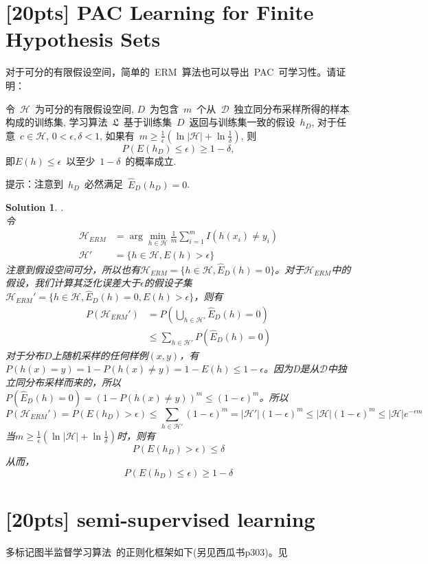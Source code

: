 \documentclass[a4paper,UTF8]{article}
\newtheorem*{solution}{Solution}
\numberwithin{equation}{section}
\begin{document}
\newpage
\section{[20pts] PAC Learning for Finite Hypothesis Sets}
对于可分的有限假设空间，简单的~ERM~算法也可以导出~PAC~可学习性。请证明：

令~$\mathcal{H}$~为可分的有限假设空间, $D$~为包含~$m$~个从~$\mathcal{D}$~独立同分布采样所得的样本构成的训练集, 学习算法~$\mathfrak{L}$~基于训练集~$D$~返回与训练集一致的假设~$h_D$, 对于任意~$c\in \mathcal{H}$, $0<\epsilon, \delta < 1$, 如果有~$m \geq \frac{1}{\epsilon}(\ln|\mathcal{H}|+\ln\frac{1}{\delta})$, 则
\begin{equation}
    P\left(E(h_D)\leq\epsilon\right)\geq 1-\delta,
\end{equation}
即$E(h)\leq\epsilon$~以至少~$1-\delta$~的概率成立.

\noindent 提示：注意到~$h_D$~必然满足~$\widehat{E}_D(h_D) = 0$.

\begin{solution}.\\
令\begin{align*}
	\mathcal{H}_{ERM}&=\arg\min_{h\in\mathcal{H}}\frac{1}{m}\sum_{i=1}^m I(h(x_i)\neq y_i)\\
	\mathcal{H}'&=\{h\in\mathcal{H},E(h)>\epsilon\}
\end{align*}
注意到假设空间可分，所以也有$\mathcal{H}_{ERM}=\{h\in\mathcal{H},\hat{E}_D(h)=0\}$。对于$\mathcal{H}_{ERM}$中的假设，我们计算其泛化误差大于$\epsilon$的假设子集$\mathcal{H}_{ERM}'=\{h\in\mathcal{H},\hat{E}_D(h)=0,E(h)>\epsilon\}$，则有
\begin{align*}
	P(\mathcal{H}_{ERM}')&= P(\bigcup_{h\in\mathcal{H}'}\hat{E}_D(h)=0)\\
	&\leq \sum_{h\in\mathcal{H}'}P(\hat{E}_D(h)=0)
\end{align*}
对于分布$D$上随机采样的任何样例$(x,y)$，有$P(h(x)=y)=1-P(h(x)\neq y)=1-E(h)\leq1-\epsilon$。因为D是从$\mathcal{D}$中独立同分布采样而来的，所以$P(\hat{E}_D(h)=0)=(1-P(h(x)\neq y))^m\leq (1-\epsilon)^m$。所以
$$P(\mathcal{H}_{ERM}')=P(E(h_D)>\epsilon)\leq\sum_{h\in\mathcal{H}'}(1-\epsilon)^m=|\mathcal{H}'|(1-\epsilon)^m\leq|\mathcal{H}|(1-\epsilon)^m\leq|\mathcal{H}|e^{-\epsilon m}$$
当$m \geq \frac{1}{\epsilon}(\ln|\mathcal{H}|+\ln\frac{1}{\delta})$时，则有
$$P(E(h_D)>\epsilon)\leq \delta$$
从而，$$P\left(E(h_D)\leq\epsilon\right)\geq 1-\delta$$
\end{solution}

\section{\textbf{[20pts]} semi-supervised learning}
	多标记图半监督学习算法~\citep{conf/nips/ZhouBLWS03}的正则化框架如下(另见西瓜书p303)。见~\citep{timmurphy.org}
\end{document}
